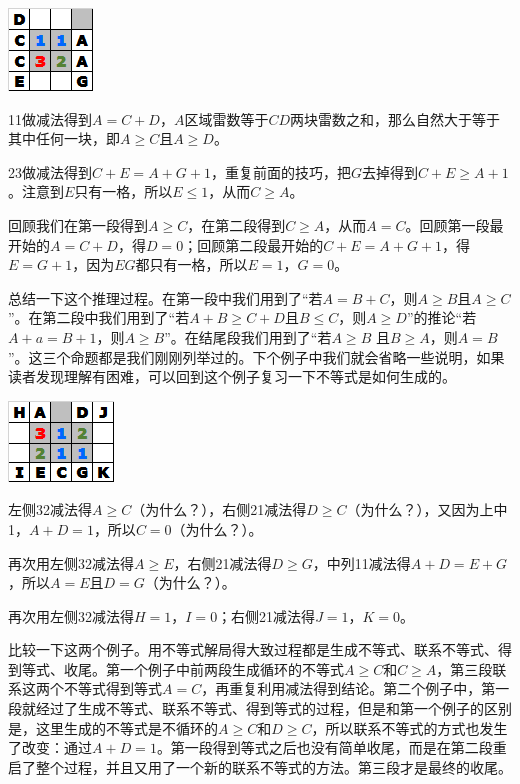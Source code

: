 \vspace{5mm}
\begin{center}
    \includegraphics{trick/不等式1.png}
\end{center}
11做减法得到$A=C+D$，$A$区域雷数等于$CD$两块雷数之和，那么自然大于等于其中任何一块，即$A\ge C$且$A\ge D$。

23做减法得到$C+E=A+G+1$，重复前面的技巧，把$G$去掉得到$C+E\ge A+1$。注意到$E$只有一格，所以$E\le 1$，从而$C\ge A$。

回顾我们在第一段得到$A\ge C$，在第二段得到$C\ge A$，从而$A=C$。回顾第一段最开始的$A=C+D$，得$D=0$；回顾第二段最开始的$C+E=A+G+1$，得$E=G+1$，因为$EG$都只有一格，所以$E=1$，$G=0$。

总结一下这个推理过程。在第一段中我们用到了“若$A=B+C$，则$A\ge B$且$A\ge C$”。在第二段中我们用到了“若$A+B\ge C+D$且$B\le C$，则$A\ge D$”的推论“若$A+a=B+1$，则$A\ge B$”。在结尾段我们用到了“若$A\ge B$ 且$B\ge A$，则$A=B$”。这三个命题都是我们刚刚列举过的。下个例子中我们就会省略一些说明，如果读者发现理解有困难，可以回到这个例子复习一下不等式是如何生成的。

\vspace{5mm}
\begin{center}
    \includegraphics{trick/不等式2.png}
\end{center}
左侧32减法得$A\ge C$（为什么？），右侧21减法得$D\ge C$（为什么？），又因为上中1，$A+D=1$，所以$C=0$（为什么？）。

再次用左侧32减法得$A\ge E$，右侧21减法得$D\ge G$，中列11减法得$A+D=E+G$，所以$A=E$且$D=G$（为什么？）。

再次用左侧32减法得$H=1$，$I=0$；右侧21减法得$J=1$，$K=0$。

\vspace{5mm}比较一下这两个例子。用不等式解局得大致过程都是生成不等式、联系不等式、得到等式、收尾。第一个例子中前两段生成循环的不等式$A\ge C$和$C\ge A$，第三段联系这两个不等式得到等式$A=C$，再重复利用减法得到结论。第二个例子中，第一段就经过了生成不等式、联系不等式、得到等式的过程，但是和第一个例子的区别是，这里生成的不等式是不循环的$A\ge C$和$D\ge C$，所以联系不等式的方式也发生了改变：通过$A+D=1$。第一段得到等式之后也没有简单收尾，而是在第二段重启了整个过程，并且又用了一个新的联系不等式的方法。第三段才是最终的收尾。

